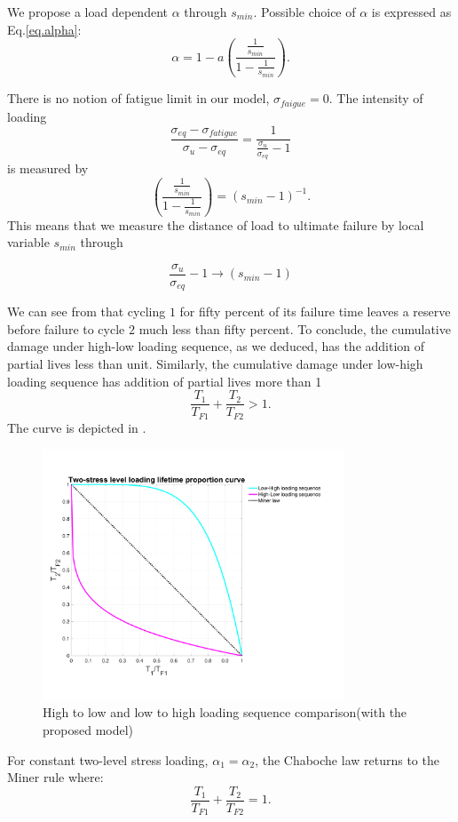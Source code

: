 We propose a load dependent $\alpha$ through $s_{min}$. Possible choice
of $\alpha$ is expressed as Eq.\eqref{eq.alpha}:
\begin{equation}
\alpha=1-a\left( \dfrac{\frac{1}{s_{min}}}{1-\frac{1}{s_{min}}} \right) .
\label{eq.alpha}
\end{equation}

There is no notion of fatigue limit in our model, $\sigma_{faigue}=0$. The intensity of loading
$$\frac{ \sigma_{eq}-\sigma_{fatigue}}{ \sigma_{u} - \sigma_{eq}}= \frac{ 1}{\frac{\sigma_{u}}{\sigma_{eq}} -1}$$
is measured by 
$$\left( \dfrac{\frac{1}{s_{min}}}{1-\frac{1}{s_{min}}}\right) =\left(s_{min}-1 \right) ^{-1}.$$
This means that we measure the distance of load to ultimate failure by local variable $s_{min}$ through 

$$\frac{\sigma_{u}}{\sigma_{eq}} -1 \longrightarrow \left( s_{min}-1\right)  $$


We can see from  that cycling $1$ for fifty percent of its failure time leaves a reserve before failure to cycle $2$ much less than fifty percent. To conclude, the cumulative damage under high-low loading sequence, as we deduced, has the addition of partial lives less than unit. Similarly, the cumulative damage under low-high loading sequence has addition of partial lives more than 1
$$\frac{T_1}{T_{F1}}+\frac{T_2}{T_{F2}}>1.$$
The curve is depicted in .
\begin{figure}[!h]
\centering
\includegraphics[width=0.8\textwidth]{figures//sequence.png} 
\caption{High to low and low to high loading sequence comparison(with the proposed model)}
\label{fig.sequence}
\end{figure}
For constant two-level stress loading, $\alpha_1=\alpha_2$, the Chaboche law returns to the Miner rule where:
$$\frac{T_1}{T_{F1}}+\frac{T_2}{T_{F2}}=1.$$

